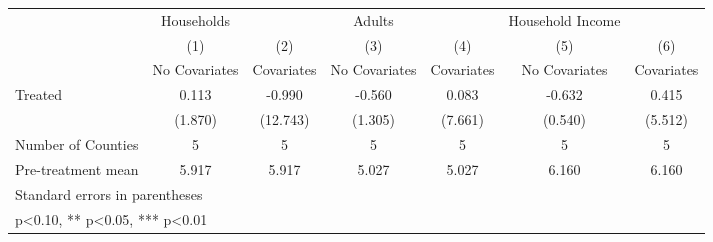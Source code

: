 {
\def\sym#1{\ifmmode^{#1}\else\(^{#1}\)\fi}
\begin{tabular}{l*{6}{c}}
\hline\hline
            &  Households   &               &      Adults   &               &Household Income   &               \\
            &\multicolumn{1}{c}{(1)}&\multicolumn{1}{c}{(2)}&\multicolumn{1}{c}{(3)}&\multicolumn{1}{c}{(4)}&\multicolumn{1}{c}{(5)}&\multicolumn{1}{c}{(6)}\\
            &\multicolumn{1}{c}{No Covariates}&\multicolumn{1}{c}{Covariates}&\multicolumn{1}{c}{No Covariates}&\multicolumn{1}{c}{Covariates}&\multicolumn{1}{c}{No Covariates}&\multicolumn{1}{c}{Covariates}\\
\hline
Treated     &       0.113   &      -0.990   &      -0.560   &       0.083   &      -0.632   &       0.415   \\
            &     (1.870)   &    (12.743)   &     (1.305)   &     (7.661)   &     (0.540)   &     (5.512)   \\
\hline
Number of Counties&           5   &           5   &           5   &           5   &           5   &           5   \\
Pre-treatment mean&       5.917   &       5.917   &       5.027   &       5.027   &       6.160   &       6.160   \\
\hline\hline
\multicolumn{7}{l}{\footnotesize Standard errors in parentheses}\\
\multicolumn{7}{l}{\footnotesize * p<0.10, ** p<0.05, *** p<0.01}\\
\end{tabular}
}
